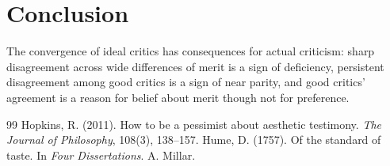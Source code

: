 \documentclass{situationist-preprint}
\begin{document}
\section{Conclusion}

The convergence of ideal critics has consequences for actual criticism: sharp disagreement across wide differences of merit is a sign of deficiency, persistent disagreement among good critics is a sign of near parity, and good critics' agreement is a reason for belief about merit though not for preference.

\begin{thebibliography}{99}\small
{} Hopkins, R. (2011). How to be a pessimist about aesthetic testimony. \emph{The Journal of Philosophy}, 108(3), 138--157.
 Hume, D. (1757). Of the standard of taste. In \emph{Four Dissertations}. A. Millar.
\end{thebibliography}
\end{document}
